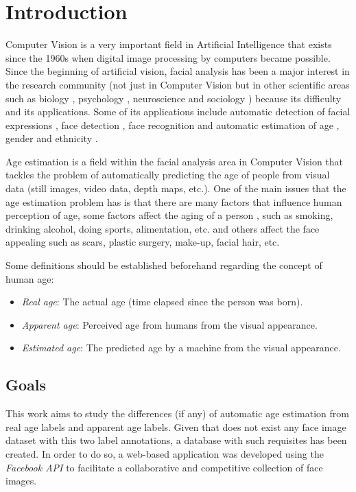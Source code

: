 \chapter{Introduction} \label{chap:introduction}

Computer Vision is a very important field in Artificial Intelligence that exists since the 1960s when digital image processing by computers became possible. Since the beginning of artificial vision, facial analysis has been a major interest in the research community (not just in Computer Vision but in other scientific areas such as biology \cite{bhl24064}, psychology \cite{ekm02}, neuroscience \cite{freiwald2009face} and sociology \cite{kemper1978social}) because its difficulty and its applications. Some of its applications include automatic detection of facial expressions \cite{cohen2003facial}, face detection \cite{hsu2002face}, face recognition \cite{wright2009robust} \cite{taigman2014deepface} and automatic estimation of age \cite{4359348}, gender \cite{alexandre2010gender} and ethnicity \cite{hosoi2004ethnicity}.

Age estimation is a field within the facial analysis area in Computer Vision that tackles the problem of automatically predicting the age of people from visual data (still images, video data, depth maps, etc.). One of the main issues that the age estimation problem has is that there are many factors that influence human perception of age, some factors affect the aging of a person \cite{shephard1997aging}, such as smoking, drinking alcohol, doing sports, alimentation, etc. and others affect the face appealing such as scars, plastic surgery, make-up, facial hair, etc.

Some definitions should be established beforehand regarding the concept of human age:
\begin{itemize}
	\item \textit{Real age}: The actual age (time elapsed since the person was born).
	\item \textit{Apparent age}: Perceived age from humans from the visual appearance. 
	\item \textit{Estimated age}: The predicted age by a machine from the visual appearance.
\end{itemize}

\section{Goals}
This work aims to study the differences (if any) of automatic age estimation from real age labels and apparent age labels. Given that does not exist any face image dataset with this two label annotations, a database with such requisites has been created. In order to do so, a web-based application was developed using the \textit{Facebook API} to facilitate a collaborative and competitive collection of face images.

